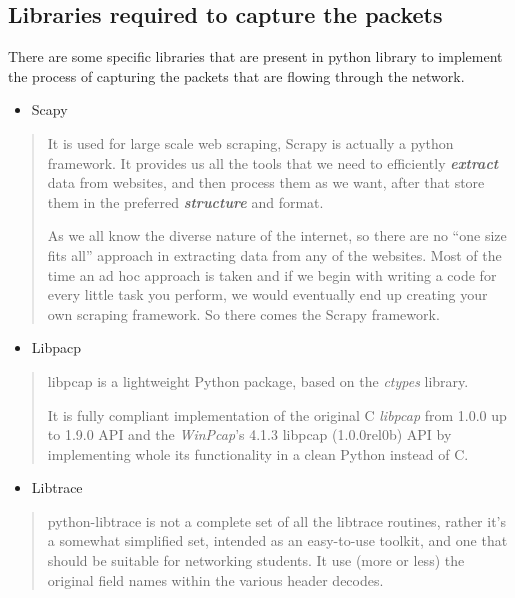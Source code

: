 \documentclass[a4paper,12pt]{report}
\begin{document}
\subsection{Libraries required to capture the packets}

There are some specific libraries that are present in python library to
implement the process of capturing the packets that are flowing through
the network.

\begin{itemize}
\item
  Scapy
\end{itemize}

\begin{quote}
It is used for large scale web scraping, Scrapy is actually a python
framework. It provides us all the tools that we need to efficiently
\emph{\textbf{extract}} data from websites, and then process them as we
want, after that store them in the preferred \emph{\textbf{structure}}
and format.

As we all know the diverse nature of the internet, so there are no ``one
size fits all'' approach in extracting data from any of the websites.
Most of the time an ad hoc approach is taken and if we begin with
writing a code for every little task you perform, we would eventually
end up creating your own scraping framework. So there comes the Scrapy
framework.
\end{quote}

\begin{itemize}
\item
  Libpacp
\end{itemize}

\begin{quote}
libpcap is a lightweight Python package, based on the \emph{ctypes}
library.

It is fully compliant implementation of the original C \emph{libpcap}
from 1.0.0 up to 1.9.0 API and the \emph{WinPcap}'s 4.1.3 libpcap
(1.0.0rel0b) API by implementing whole its functionality in a clean
Python instead of C.
\end{quote}

\begin{itemize}
\item
  Libtrace
\end{itemize}

\begin{quote}
python-libtrace is not a complete set of all the libtrace routines,
rather it's a somewhat simplified set, intended as an easy-to-use
toolkit, and one that should be suitable for networking students. It use
(more or less) the original field names within the various header
decodes.
\end{quote}
\end{document}
